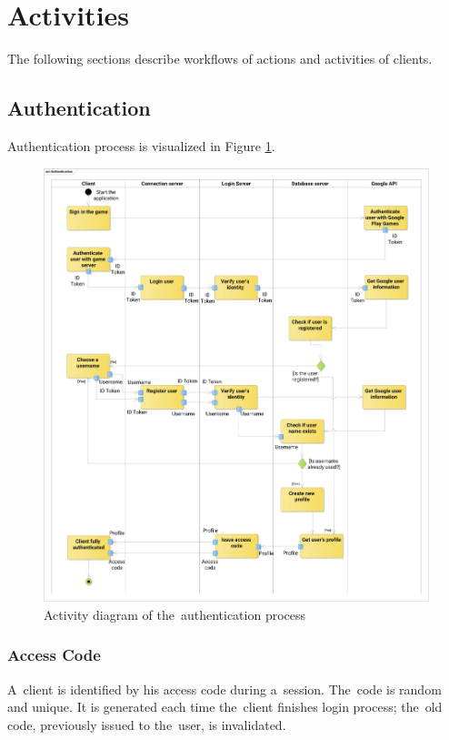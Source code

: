 \section{Activities}
The following sections describe workflows of actions and activities of clients.
	\subsection{Authentication}
	Authentication process is visualized in Figure \ref{fig:adauth}.
	
	\begin{figure}[h]	
		\includegraphics[width=\textwidth]{figures/AD_Authentication2}
		\centering			
		\caption{Activity diagram of the~authentication process}
		\label{fig:adauth}
	\end{figure}

		\subsubsection*{Access Code}
		A~client is identified by his access code during a~session. The~code is random and unique. It is generated each time the~client finishes login process; the~old code,  previously issued to the~user, is invalidated.
		
